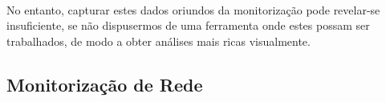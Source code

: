 \paragraph*{
}
No entanto, capturar estes dados oriundos da monitorização pode revelar-se insuficiente, se não dispusermos de uma ferramenta onde estes possam ser trabalhados, de modo a obter análises mais ricas visualmente.

\subsection{Monitorização de Rede}\label{sect:packet_capture}

% 
% 
% 
% 
% 
